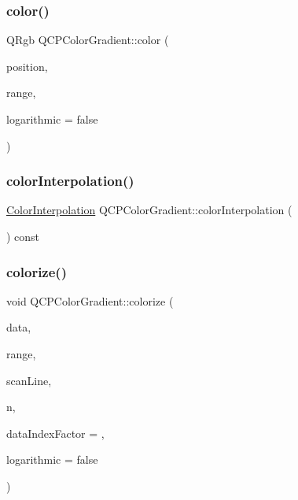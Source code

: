 \subsubsection{\texorpdfstring{color()}{color()}}
{\footnotesize\ttfamily Q\+Rgb Q\+C\+P\+Color\+Gradient\+::color (\begin{DoxyParamCaption}\item[{double}]{position,  }\item[{const \mbox{\hyperlink{class_q_c_p_range}{Q\+C\+P\+Range}} \&}]{range,  }\item[{bool}]{logarithmic = {\ttfamily false} }\end{DoxyParamCaption})}

\mbox{\label{class_q_c_p_color_gradient_abad5002858db8cf75ecb045200881de6}} 
\subsubsection{\texorpdfstring{colorInterpolation()}{colorInterpolation()}}
{\footnotesize\ttfamily \mbox{\hyperlink{class_q_c_p_color_gradient_ac5dca17cc24336e6ca176610e7f77fc1}{Color\+Interpolation}} Q\+C\+P\+Color\+Gradient\+::color\+Interpolation (\begin{DoxyParamCaption}{ }\end{DoxyParamCaption}) const\hspace{0.3cm}{\ttfamily [inline]}}

\mbox{\label{class_q_c_p_color_gradient_aaf423ceb943e177b0ed2c48c811d83dc}} 
\subsubsection{\texorpdfstring{colorize()}{colorize()}\hspace{0.1cm}{\footnotesize\ttfamily [1/2]}}
{\footnotesize\ttfamily void Q\+C\+P\+Color\+Gradient\+::colorize (\begin{DoxyParamCaption}\item[{const double $\ast$}]{data,  }\item[{const \mbox{\hyperlink{class_q_c_p_range}{Q\+C\+P\+Range}} \&}]{range,  }\item[{Q\+Rgb $\ast$}]{scan\+Line,  }\item[{int}]{n,  }\item[{int}]{data\+Index\+Factor = {},  }\item[{bool}]{logarithmic = {\ttfamily false} }\end{DoxyParamCaption})}

